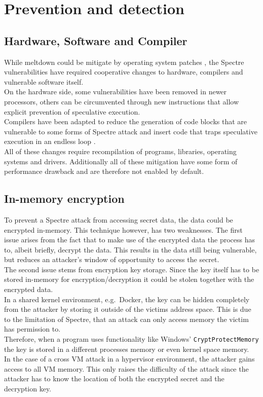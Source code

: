 \documentclass[conference,compsoc,final,a4paper]{IEEEtran}
\begin{document}
\section{Prevention and detection}
\subsection{Hardware, Software and Compiler}
While meltdown could be mitigate by operating system patches \cite{linuxKAISER}, the Spectre vulnerabilities have required cooperative changes to hardware, compilers and vulnerable software itself. \\
On the hardware side, some vulnerabilities have been removed in newer processors, others can be circumvented through new instructions that allow explicit prevention of speculative execution. \cite{intelMitigation} \\
Compilers have been adapted to reduce the generation of code blocks that are vulnerable to some forms of Spectre attack \cite{msvcQSpectre} and insert code that traps speculative execution in an endless loop \cite{retpolineTurner}. \\
All of these changes require recompilation of programs, libraries, operating systems and drivers. Additionally all of these mitigation have some form of performance drawback and are therefore not enabled by default.
\subsection{In-memory encryption}
To prevent a Spectre attack from accessing secret data, the data could be encrypted in-memory. This technique however, has two weaknesses. The first issue arises from the
fact that to make use of the encrypted data the process has to, albeit briefly, decrypt the data. This results in the data still being vulnerable, but reduces an attacker's
window of opportunity to access the secret. \\
The second issue stems from encryption key storage. Since the key itself has to be stored in-memory for encryption/decryption it could be stolen together with the
encrypted data. \\
In a shared kernel environment, e.g.\  Docker, the key can be hidden completely from the attacker by storing it outside of the victims address space. This is due to
the limitation of Spectre, that an attack can only access memory the victim has permission to. \cite{kocher2018spectre} \\
Therefore, when a program uses functionality like Windows' \lstinline|CryptProtectMemory| \cite{winCryptMem} the key is stored in a different processes memory or even
kernel space memory. \\
In the case of a cross VM attack in a hypervisor environment, the attacker gains access to all VM memory. This only raises the difficulty of the attack since the attacker
has to know the location of both the encrypted secret and the decryption key.
\end{document}

